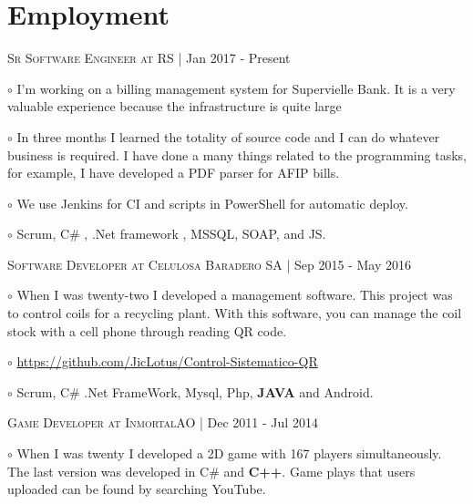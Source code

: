 \documentclass[letterpaper]{article}
\renewenvironment{itemize}{
  \begin{list}{}{
    \setlength{\leftmargin}{1.5em}
  }
}{
  \end{list}
}
\newenvironment{no-indent-itemize}{
  \begin{list}{}{
    \setlength{\leftmargin}{0em}
  }
}{
  \end{list}
}
\def\bullet{$\circ$\xspace}
\begin{document}
\section*{Employment}
\begin{no-indent-itemize}

    \item\textsc{Sr Software Engineer at RS} | Jan 2017 - Present
    \begin{itemize}
    \item\bullet I'm working on a billing management system for Supervielle Bank. It is a very valuable experience because the infrastructure is quite large
    \item\bullet In three months I learned the totality of source code and I can do whatever business is required. I have done a many things related to the programming tasks, for example, I have developed a PDF parser for AFIP bills.
    \item\bullet We use Jenkins for CI and scripts in PowerShell for automatic deploy.
    \item\bullet  Scrum, C\# , .Net framework , MSSQL, SOAP, and JS.
    \end{itemize}


    \item \textsc{Software Developer at Celulosa Baradero SA} | Sep 2015 - May 2016
    \begin{itemize}
    \item\bullet  When I was twenty-two I developed a management software. This project was to control coils for a recycling plant. With this software, you can manage the coil stock with a cell phone through reading QR code.
    \item\bullet
    \href{https://github.com/JicLotus/Control-Sistematico-QR}{https://github.com/JicLotus/Control-Sistematico-QR}
    \item\bullet Scrum, C\# .Net FrameWork, Mysql, Php, \textbf{JAVA} and Android.
    \end{itemize}
    
    
    \item\textsc{Game Developer at InmortalAO} | Dec 2011 - Jul 2014
    \begin{itemize} 
    \item\bullet
    When I was twenty I developed a 2D game with 167 players simultaneously. The last version was developed in C\# and \textbf{C++}. Game plays that users uploaded can be found by searching YouTube.
    
    
    

\end{itemize}
\end{no-indent-itemize}
\end{document}
